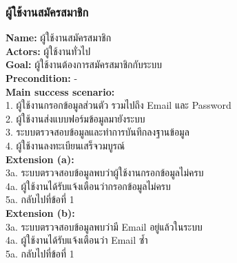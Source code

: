 \documentclass[12pt,oneside,openright,a4paper]{cpe-thai-project}
\begin{document}
\subsubsection{ผู้ใช้งานสมัครสมาชิก}
\textbf{Name: }ผู้ใช้งานสมัครสมาชิก \\
\textbf{Actors: }ผู้ใช้งานทั่วไป \\
\textbf{Goal: }ผู้ใช้งานต้องการสมัครสมาชิกกับระบบ \\
\textbf{Precondition: }- \\
\textbf{Main success scenario: } \\
  \hspace*{0.5cm}1. ผู้ใช้งานกรอกข้อมูลส่วนตัว รวมไปถึง Email และ Password \\
  \hspace*{0.5cm}2. ผู้ใช้งานส่งแบบฟอร์มข้อมูลมายังระบบ \\
  \hspace*{0.5cm}3. ระบบตรวจสอบข้อมูลและทำการบันทึกลงฐานข้อมูล \\
  \hspace*{0.5cm}4. ผู้ใช้งานลงทะเบียนเสร็จวมบูรณ์ \\
\textbf{Extension (a): } \\
  \hspace*{0.5cm}3a. ระบบตรวจสอบข้อมูลพบว่าผู้ใช้งานกรอกข้อมูลไม่ครบ \\
  \hspace*{0.5cm}4a. ผู้ใช้งานได้รับแจ้งเตือนว่ากรอกข้อมูลไม่ครบ \\
  \hspace*{0.5cm}5a. กลับไปที่ข้อที่ 1 \\
\textbf{Extension (b): }  \\
  \hspace*{0.5cm}3a. ระบบตรวจสอบข้อมูลพบว่ามี Email อยู่แล้วในระบบ \\
  \hspace*{0.5cm}4a. ผู้ใช้งานได้รับแจ้งเตือนว่า Email ซ้ำ \\
  \hspace*{0.5cm}5a. กลับไปที่ข้อที่ 1 
\newpage
\end{document}
